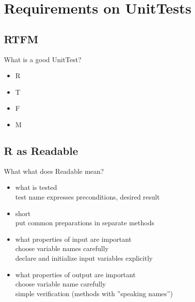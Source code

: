 \documentclass[SoftwareQuality.tex]{subfiles}
\begin{document}
\section{Requirements on UnitTests}

\subsection*{RTFM}
\begin{frame}{What is a good UnitTest?} 
\Large
\begin{itemize}
\item  R
\item  T
\item  F
\item  M
\end{itemize}
\end{frame}


\subsection*{R as Readable}
\begin{frame}{What what does Readable mean?} 
\begin{itemize}
\item   what is tested
	\\{\footnotesize
		test name expresses preconditions, desired result
	}
\item   short
	\\{\footnotesize 
		put common preparations in separate methods
	}
\item   what properties of input are important
	\\{\footnotesize 
		choose variable names carefully
		\\declare and initialize input variables explicitly
	}
\item   what properties of output are important
	\\{\footnotesize 
		choose variable name carefully\\
		simple verification (methods with ''speaking names'')
	}
\end{itemize}
\end{frame}
\end{document}

